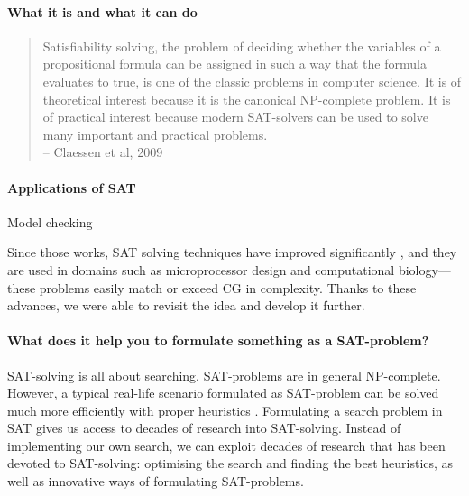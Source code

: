 \paragraph{What it is and what it can do}


\begin{quote}
Satisfiability solving, the problem of deciding whether the variables of a propositional formula can be assigned in such a way that the formula evaluates to true, is one of the classic problems in computer science. It is of theoretical interest because it is the canonical NP-complete problem. It is of practical interest because modern SAT-solvers can be used to solve many important and practical problems. \\
-- Claessen et al, 2009
\end{quote}


\paragraph{Applications of SAT}

Model checking

Since those works, SAT solving techniques have improved significantly \cite{marques_silva2010}, and they are used in domains such as microprocessor design and computational 
biology---these problems easily match or exceed CG in complexity. 
Thanks to these advances, we were able to revisit the idea and develop it
further. 


\paragraph{What does it help you to formulate something as a SAT-problem?}

SAT-solving is all about searching.
SAT-problems are in general NP-complete. However, a typical real-life scenario formulated as SAT-problem can be solved much more efficiently with proper heuristics \cite{claessen2009satpractice}.
Formulating a search problem in SAT gives us access to decades of research into SAT-solving. 
Instead of implementing our own search, we can exploit decades of research that has been devoted to SAT-solving: optimising the search and finding the best heuristics, as well as innovative ways of formulating SAT-problems.